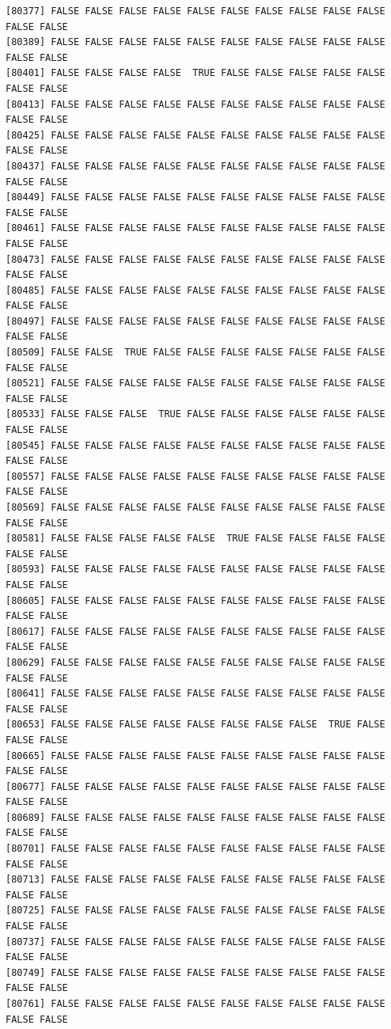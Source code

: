 \documentclass[
  a4paper,
  DIV=11,
  numbers=noendperiod]{scrartcl}
\begin{document}
\begin{verbatim}
[80377] FALSE FALSE FALSE FALSE FALSE FALSE FALSE FALSE FALSE FALSE FALSE FALSE
[80389] FALSE FALSE FALSE FALSE FALSE FALSE FALSE FALSE FALSE FALSE FALSE FALSE
[80401] FALSE FALSE FALSE FALSE  TRUE FALSE FALSE FALSE FALSE FALSE FALSE FALSE
[80413] FALSE FALSE FALSE FALSE FALSE FALSE FALSE FALSE FALSE FALSE FALSE FALSE
[80425] FALSE FALSE FALSE FALSE FALSE FALSE FALSE FALSE FALSE FALSE FALSE FALSE
[80437] FALSE FALSE FALSE FALSE FALSE FALSE FALSE FALSE FALSE FALSE FALSE FALSE
[80449] FALSE FALSE FALSE FALSE FALSE FALSE FALSE FALSE FALSE FALSE FALSE FALSE
[80461] FALSE FALSE FALSE FALSE FALSE FALSE FALSE FALSE FALSE FALSE FALSE FALSE
[80473] FALSE FALSE FALSE FALSE FALSE FALSE FALSE FALSE FALSE FALSE FALSE FALSE
[80485] FALSE FALSE FALSE FALSE FALSE FALSE FALSE FALSE FALSE FALSE FALSE FALSE
[80497] FALSE FALSE FALSE FALSE FALSE FALSE FALSE FALSE FALSE FALSE FALSE FALSE
[80509] FALSE FALSE  TRUE FALSE FALSE FALSE FALSE FALSE FALSE FALSE FALSE FALSE
[80521] FALSE FALSE FALSE FALSE FALSE FALSE FALSE FALSE FALSE FALSE FALSE FALSE
[80533] FALSE FALSE FALSE  TRUE FALSE FALSE FALSE FALSE FALSE FALSE FALSE FALSE
[80545] FALSE FALSE FALSE FALSE FALSE FALSE FALSE FALSE FALSE FALSE FALSE FALSE
[80557] FALSE FALSE FALSE FALSE FALSE FALSE FALSE FALSE FALSE FALSE FALSE FALSE
[80569] FALSE FALSE FALSE FALSE FALSE FALSE FALSE FALSE FALSE FALSE FALSE FALSE
[80581] FALSE FALSE FALSE FALSE FALSE  TRUE FALSE FALSE FALSE FALSE FALSE FALSE
[80593] FALSE FALSE FALSE FALSE FALSE FALSE FALSE FALSE FALSE FALSE FALSE FALSE
[80605] FALSE FALSE FALSE FALSE FALSE FALSE FALSE FALSE FALSE FALSE FALSE FALSE
[80617] FALSE FALSE FALSE FALSE FALSE FALSE FALSE FALSE FALSE FALSE FALSE FALSE
[80629] FALSE FALSE FALSE FALSE FALSE FALSE FALSE FALSE FALSE FALSE FALSE FALSE
[80641] FALSE FALSE FALSE FALSE FALSE FALSE FALSE FALSE FALSE FALSE FALSE FALSE
[80653] FALSE FALSE FALSE FALSE FALSE FALSE FALSE FALSE  TRUE FALSE FALSE FALSE
[80665] FALSE FALSE FALSE FALSE FALSE FALSE FALSE FALSE FALSE FALSE FALSE FALSE
[80677] FALSE FALSE FALSE FALSE FALSE FALSE FALSE FALSE FALSE FALSE FALSE FALSE
[80689] FALSE FALSE FALSE FALSE FALSE FALSE FALSE FALSE FALSE FALSE FALSE FALSE
[80701] FALSE FALSE FALSE FALSE FALSE FALSE FALSE FALSE FALSE FALSE FALSE FALSE
[80713] FALSE FALSE FALSE FALSE FALSE FALSE FALSE FALSE FALSE FALSE FALSE FALSE
[80725] FALSE FALSE FALSE FALSE FALSE FALSE FALSE FALSE FALSE FALSE FALSE FALSE
[80737] FALSE FALSE FALSE FALSE FALSE FALSE FALSE FALSE FALSE FALSE FALSE FALSE
[80749] FALSE FALSE FALSE FALSE FALSE FALSE FALSE FALSE FALSE FALSE FALSE FALSE
[80761] FALSE FALSE FALSE FALSE FALSE FALSE FALSE FALSE FALSE FALSE FALSE FALSE

\end{verbatim}
\end{document}
